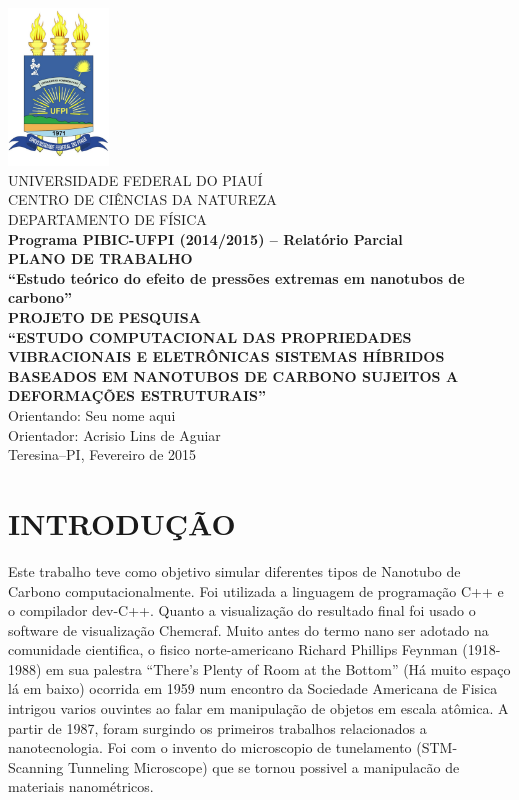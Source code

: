 \documentclass[12pt,a4paper]{report}
\begin{document}
\fontsize{15pt}{17pt}\selectfont

\begin{titlepage}
\begin{center}
\includegraphics[width=0.2\textwidth]{./logo1.pdf}\\[0.2cm]
\textsc{UNIVERSIDADE FEDERAL DO PIAUÍ}\\[0.2cm]
\textsc{CENTRO DE CIÊNCIAS DA NATUREZA}\\[0.2cm]
\textsc{DEPARTAMENTO DE FÍSICA}\\[2.0cm]
{\textbf{Programa PIBIC-UFPI (2014/2015) – Relatório Parcial}}\\[1.0cm]
{\textbf{PLANO DE TRABALHO}}\\[0.4cm]
{\textbf{``Estudo teórico do efeito de pressões extremas em nanotubos de
carbono''}}\\[1.5cm]
{\textbf{PROJETO DE PESQUISA}}\\[0.4cm]
{\textbf{``ESTUDO COMPUTACIONAL DAS PROPRIEDADES VIBRACIONAIS E ELETRÔNICAS 
SISTEMAS HÍBRIDOS BASEADOS EM NANOTUBOS DE CARBONO SUJEITOS A DEFORMAÇÕES ESTRUTURAIS''}}\\[2.0cm]

{Orientando: Seu nome aqui}\\[1.0cm]
{Orientador: Acrisio Lins de Aguiar}\\[1.0cm]
{Teresina--PI, Fevereiro de 2015}
\end{center}

\end{titlepage}
\setcounter{page}{2}

\chapter*{INTRODUÇÃO}

Este trabalho teve como objetivo simular diferentes tipos de Nanotubo de Carbono computacionalmente. 
Foi utilizada a linguagem de programação C++  e o compilador dev-C++. Quanto a visualização do resultado final foi usado o software de visualização
Chemcraf. Muito antes do termo nano ser adotado na comunidade cientifica, o fisico  norte-americano Richard Phillips Feynman (1918-1988) 
em sua palestra “There’s Plenty of Room at the Bottom” (Há muito espaço lá em baixo) ocorrida em 1959 num encontro da 
Sociedade Americana de Fisica intrigou varios ouvintes ao falar em manipulação de objetos em escala atômica. 
A partir de 1987, foram surgindo os primeiros trabalhos relacionados a nanotecnologia. Foi com o invento do 
microscopio de tunelamento (STM- Scanning Tunneling Microscope) que se tornou possivel a manipulacão de materiais nanométricos.
\end{document}
